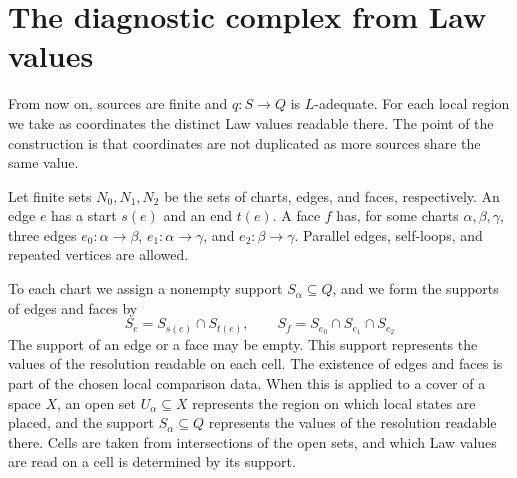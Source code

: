 \section{The diagnostic complex from Law values}\label{sec:3.3}

From now on, sources are finite and $q:S\to Q$ is $L$-adequate.
For each local region we take as coordinates the distinct Law values readable there.
The point of the construction is that coordinates are not duplicated as more sources
share the same value.

\begin{definition}\label{def:3.9}

Let finite sets $N_0,N_1,N_2$ be the sets of charts, edges, and faces, respectively.
An edge $e$ has a start $s(e)$ and an end $t(e)$.
A face $f$ has, for some charts $\alpha,\beta,\gamma$, three edges
$e_0:\alpha\to\beta$, $e_1:\alpha\to\gamma$, and
$e_2:\beta\to\gamma$. Parallel edges, self-loops, and repeated vertices are allowed.

To each chart we assign a nonempty support $S_\alpha\subseteq Q$, and we form the
supports of edges and faces by
\begin{equation*}
S_e=S_{s(e)}\cap S_{t(e)},\qquad
S_f=S_{e_0}\cap S_{e_1}\cap S_{e_2}
\tag{3.6}\label{eq:3.6}
\end{equation*}
The support of an edge or a face may be empty.
This support represents the values of the resolution readable on each cell.
The existence of edges and faces is part of the chosen local comparison data.
When this is applied to a cover of a space $X$, an open set $U_\alpha\subseteq X$
represents the region on which local states are placed, and the support
$S_\alpha\subseteq Q$ represents the values of the resolution readable there.
Cells are taken from intersections of the open sets, and which Law values are read on
a cell is determined by its support.

\end{definition}

